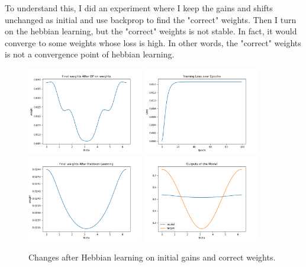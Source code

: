 \documentclass[12pt, a4paper]{article}
\begin{document}
To understand this, I did an experiment where I keep the gains and shifts unchanged as initial and use backprop to find the "correct" weights. Then I turn on the hebbian learning, but the "correct" weights is not stable. In fact, it would converge to some weights whose loss is high. In other words, the "correct" weights is not a convergence point of hebbian learning.

\begin{figure}[H]
    \centering
    \includegraphics[width=0.45\textwidth]{baseline_abb05/fig/0122_abb05_wt_weights.png}
    \includegraphics[width=0.45\textwidth]{baseline_abb05/fig/0122_abb05_wtconv_loss.png} \\
    \includegraphics[width=0.45\textwidth]{baseline_abb05/fig/0122_abb05_wtconv_weights.png}
    \includegraphics[width=0.45\textwidth]{baseline_abb05/fig/0122_abb05_wtconv_output.png}
    \caption{Changes after Hebbian learning on initial gains and correct weights.}
\end{figure}
\end{document}
